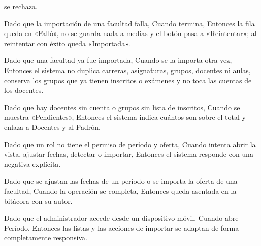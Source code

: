 {      se rechaza.
\item Dado que la importación de una facultad falla, Cuando termina, Entonces la fila
      queda en «Falló», no se guarda nada a medias y el botón pasa a «Reintentar»; al
      reintentar con éxito queda «Importada».
\item Dado que una facultad ya fue importada, Cuando se la importa otra vez, Entonces el
      sistema no duplica carreras, asignaturas, grupos, docentes ni aulas, conserva los
      grupos que ya tienen inscritos o exámenes y no toca las cuentas de los docentes.
\item Dado que hay docentes sin cuenta o grupos sin lista de inscritos, Cuando se muestra
      «Pendientes», Entonces el sistema indica cuántos son sobre el total y enlaza a
      Docentes y al Padrón.
\item Dado que un rol no tiene el permiso de período y oferta, Cuando intenta abrir la
      vista, ajustar fechas, detectar o importar, Entonces el sistema responde con una
      negativa explícita.
\item Dado que se ajustan las fechas de un período o se importa la oferta de una
      facultad, Cuando la operación se completa, Entonces queda asentada en la bitácora
      con su autor.
\item Dado que el administrador accede desde un dispositivo móvil, Cuando abre Período,
      Entonces las listas y las acciones de importar se adaptan de forma completamente
      responsiva.}

\def\HUPruebas{%
\item \texttt{DetectarPeriodosTest}: detección a partir de la oferta y de los
      calendarios, período sin fechas publicadas, volver a detectar sin duplicar y sin
      pisar las fechas ajustadas a mano (criterios 2, 3 y 6).
\item \texttt{PeriodosTest}: lista con los vigentes primero y paginada, resumen con el
      período principal, la ventana de exámenes y los pendientes, ajuste de fechas y su
      validación (criterios 1, 4, 5, 7 y 13).
\item \texttt{ImportarOfertaTest}: importación de una facultad con su registro, grupo
      repetido en dos carreras, docente de dos facultades, aula sin edificio y sesiones
      descartadas (criterio 9).
\item \texttt{ImportarOfertaTest}: importar dos veces no duplica, el grupo que ya no
      viene se conserva solo si tiene estudiantes, la cuenta del docente no se toca y un
      fallo no deja nada a medias (criterios 11 y 12).
\item \texttt{ImportacionPorHttpTest}: resumen de la importación, fallo con su motivo,
      importación en curso que bloquea otra y facultad no válida (criterios 8 a 11).
\item \texttt{PeriodosTest} e \texttt{ImportacionPorHttpTest}: sin sesión, rol sin
      permiso y asiento en la bitácora del ajuste y de la importación (criterios 14
      y 15).
\item \texttt{Periodo.test.jsx} (por escribir): estados de cada facultad, botón
      deshabilitado al importar, reintento, diálogo de ajuste con su error y enlaces de
      pendientes (criterios 3, 5, 8, 10, 11, 13 y 16).}


